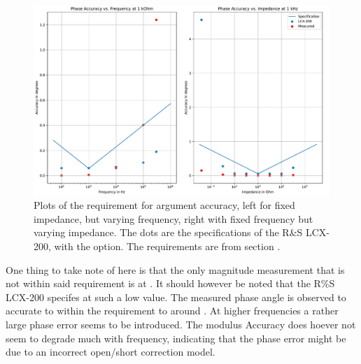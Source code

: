 \begin{figure}[H]
    \centering
    \includegraphics[width=1\textwidth]{Sections/8_SystemVerification/Figures/SpecVTest_Phase.pdf}
    \caption{Plots of the requirement for argument accuracy, left for fixed impedance, but varying frequency, right with fixed frequency but varying impedance. The dots are the specifications of the R\&S LCX-200, with the  option. The requirements are from section .}
    \label{fig_8_ArgumentAccuracy}
\end{figure}
  
One thing to take note of here is that the only magnitude measurement that is not within said requirement is at . It should however be noted that the R\%S LCX-200 specifes  at such a low value. The measured phase angle is observed to accurate to within the requirement to around . At higher frequencies a rather large phase error seems to be introduced. The modulus Accuracy does hoever not seem to degrade much with frequency, indicating that the phase error might be due to an incorrect open/short correction model.
